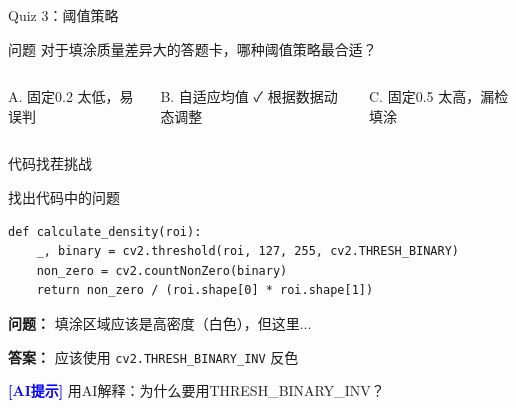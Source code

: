 \begin{frame}{Quiz 3：阈值策略}
    \begin{block}{问题}
    对于填涂质量差异大的答题卡，哪种阈值策略最合适？
    \end{block}

    \begin{columns}
        \begin{alertblock}{A. 固定0.2}
        太低，易误判
        \end{alertblock}

        \begin{exampleblock}{B. 自适应均值 ✓}
        根据数据动态调整
        \end{exampleblock}

        \begin{alertblock}{C. 固定0.5}
        太高，漏检填涂
        \end{alertblock}
    \end{columns}
\end{frame}

\begin{frame}{代码找茬挑战}
    \begin{block}{找出代码中的问题}
    \begin{lstlisting}
def calculate_density(roi):
    _, binary = cv2.threshold(roi, 127, 255, cv2.THRESH_BINARY)
    non_zero = cv2.countNonZero(binary)
    return non_zero / (roi.shape[0] * roi.shape[1])
    \end{lstlisting}
    \end{block}

    \textbf{问题：} 填涂区域应该是高密度（白色），但这里...

    \vspace{0.3cm}

    \textbf{答案：} 应该使用 \texttt{cv2.THRESH\_BINARY\_INV} 反色

    \vspace{0.3cm}

    \begin{center}
        \textcolor{blue}{\textbf{[AI提示]}} 用AI解释：为什么要用THRESH\_BINARY\_INV？
    \end{center}
\end{frame}


